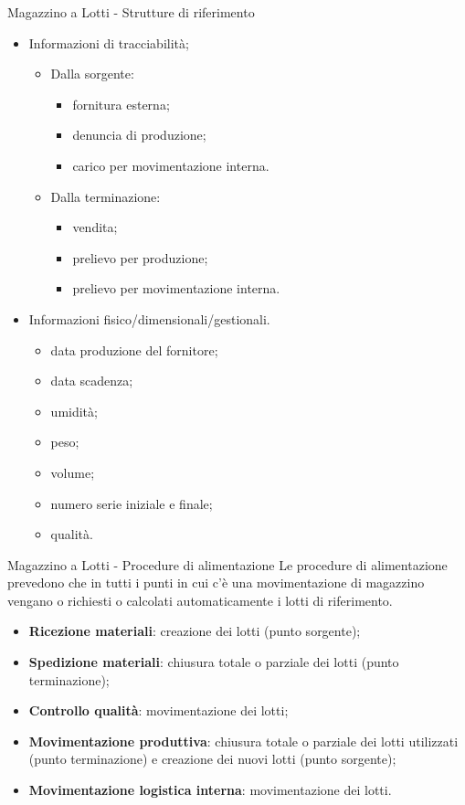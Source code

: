 \documentclass{beamer}
\begin{document}
\begin{frame}{Magazzino a Lotti - Strutture di riferimento}
    \begin{itemize}
    \item Informazioni di tracciabilità;
        \begin{itemize}
            \item Dalla sorgente:
            \begin{itemize}
                \item fornitura esterna;
                \item denuncia di produzione;
                \item carico per movimentazione interna.
            \end{itemize}
            \item Dalla terminazione:
            \begin{itemize}
                \item vendita;
                \item prelievo per produzione;
                \item prelievo per movimentazione interna.
            \end{itemize}
        \end{itemize}
        \item Informazioni fisico/dimensionali/gestionali.
        \begin{itemize}
            \item data produzione del fornitore;
            \item data scadenza;
            \item umidità;
            \item peso;
            \item volume;
            \item numero serie iniziale e finale;
            \item qualità.
        \end{itemize}
    \end{itemize}
\end{frame}

\begin{frame}{Magazzino a Lotti - Procedure di alimentazione}
    Le procedure di alimentazione prevedono che in tutti i punti in cui c'è una movimentazione di magazzino vengano o richiesti o calcolati automaticamente i lotti di riferimento.
    \begin{itemize}
        \item \textbf{Ricezione materiali}: creazione dei lotti (punto sorgente);
        \item \textbf{Spedizione materiali}: chiusura totale o parziale dei lotti (punto terminazione);
        \item \textbf{Controllo qualità}: movimentazione dei lotti;
        \item \textbf{Movimentazione produttiva}: chiusura totale o parziale dei lotti utilizzati (punto terminazione) e creazione dei nuovi lotti (punto sorgente);
        \item \textbf{Movimentazione logistica interna}: movimentazione dei lotti.
    \end{itemize}
\end{frame}
\end{document}
